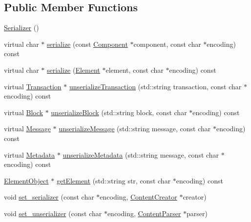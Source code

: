 \subsection*{Public Member Functions}
\begin{DoxyCompactItemize}
\item 
\mbox{\hyperlink{classSerializer_a9fe7f31924098f75278d059f8443fd5b}{Serializer}} ()
\item 
virtual char $\ast$ \mbox{\hyperlink{classSerializer_a5cfe31eb70f4d0c92f2d68c22f39e885}{serialize}} (const \mbox{\hyperlink{classComponent}{Component}} $\ast$component, const char $\ast$encoding) const
\item 
virtual char $\ast$ \mbox{\hyperlink{classSerializer_a38bec517fb3b3cc0778c75b807cb930c}{serialize}} (\mbox{\hyperlink{classElement}{Element}} $\ast$element, const char $\ast$encoding) const
\item 
virtual \mbox{\hyperlink{classTransaction}{Transaction}} $\ast$ \mbox{\hyperlink{classSerializer_ab5fa979a8486be6f49ad10f4810509d7}{unserialize\+Transaction}} (std\+::string transaction, const char $\ast$encoding) const
\item 
virtual \mbox{\hyperlink{classBlock}{Block}} $\ast$ \mbox{\hyperlink{classSerializer_a423fb7c43ca9c23e07000dba0c5a432a}{unserialize\+Block}} (std\+::string block, const char $\ast$encoding) const
\item 
virtual \mbox{\hyperlink{classMessage}{Message}} $\ast$ \mbox{\hyperlink{classSerializer_a1d16df9f35a7580da06a497dfbddffe8}{unserialize\+Message}} (std\+::string message, const char $\ast$encoding) const
\item 
virtual \mbox{\hyperlink{classMetadata}{Metadata}} $\ast$ \mbox{\hyperlink{classSerializer_a64b858f0c2968e888cf796b6f09eed7b}{unserialize\+Metadata}} (std\+::string message, const char $\ast$encoding) const
\item 
\mbox{\hyperlink{classElementObject}{Element\+Object}} $\ast$ \mbox{\hyperlink{classSerializer_ab3bcdbd49167109de13e03878337018a}{get\+Element}} (std\+::string str, const char $\ast$encoding) const
\item 
void \mbox{\hyperlink{classSerializer_a0258559787f09d3a7bfe6bb1c41cc118}{set\+\_\+serializer}} (const char $\ast$encoding, \mbox{\hyperlink{classContentCreator}{Content\+Creator}} $\ast$creator)
\item 
void \mbox{\hyperlink{classSerializer_adf32dca6325e4a613c4c7ba48a3de244}{set\+\_\+unserializer}} (const char $\ast$encoding, \mbox{\hyperlink{classContentParser}{Content\+Parser}} $\ast$parser)
\end{DoxyCompactItemize}
